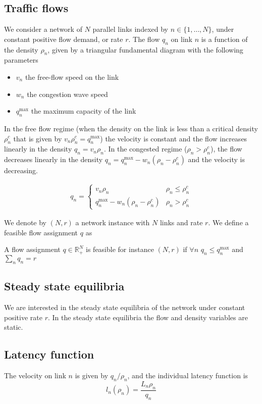 \subsection{Traffic flows}
We consider a network of $N$ parallel links indexed by $n \in \{1, \dots, N \}$, under constant positive flow demand, or rate $r$. The flow $q_n$ on link $n$ is a function of the density $\rho_n$, given by a triangular fundamental diagram with the following parameters
\begin{itemize}
\item $v_n$ the free-flow speed on the link
\item $w_n$ the congestion wave speed
\item $q_n^{\max}$ the maximum capacity of the link
\end{itemize}
In the free flow regime (when the density on the link is less than a critical density $\rho_n^c$ that is given by $v_n\rho_n^c = q_n^{\max}$) the velocity is constant and the flow increases linearly in the density $q_n = v_n \rho_n$. In the congested regime ($\rho_n > \rho_n^c$), the flow decreases linearly in the density $q_n = q_n^{\max} - w_n(\rho_n - \rho_n^c)$ and the velocity is decreasing.

\begin{align*}
q_n = 
\begin{cases}
v_n \rho_n & \rho_n \leq \rho_n^c\\
q_n^{\max} - w_n(\rho_n - \rho_n^c) & \rho_n > \rho_n^c
\end{cases}
\end{align*}

We denote by $(N, r)$ a network instance with $N$ links and rate $r$. We define a feasible flow assignment $q$ as

\begin{definition}
A flow assignment $q \in \mathbb{R}_+^N$ is feasible for instance $(N, r)$ if $\forall n$ $q_n \leq q_n^{\max}$ and $\sum_n q_n = r$
\end{definition}

\subsection{Steady state equilibria}
We are interested in the steady state equilibria of the network under constant positive rate $r$. In the steady state equilibria the flow and density variables are static.

\subsection{Latency function}
The velocity on link $n$ is given by $q_n/\rho_n$, and the individual latency function is
\[
l_n(\rho_n) = \frac{L_n\rho_n}{q_n} 
\]

